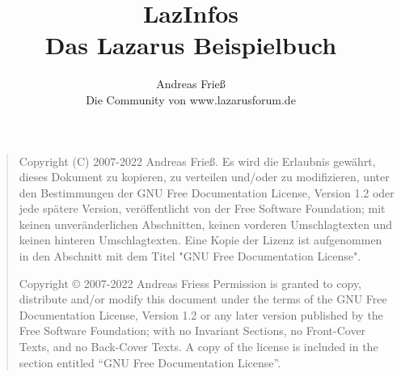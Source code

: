 \documentclass[
titlepage,						%
]
{scrreprt}
\begin{document}
\setcounter{tocdepth}{3} %

\pagestyle{empty} %
\title{LazInfos\\Das Lazarus Beispielbuch}
\author{Andreas Frieß\\Die Community von www.lazarusforum.de}

\maketitle 						%


\pagestyle{headings} %


\begin{quote}
    Copyright (C) 2007-2022 Andreas Frieß.
    Es wird die Erlaubnis gewährt, dieses Dokument zu kopieren, zu
    verteilen und/oder zu modifizieren, unter den Bestimmungen der
    GNU Free Documentation License, Version 1.2 oder jede spätere
    Version, veröffentlicht von der Free Software Foundation; mit
    keinen unveränderlichen Abschnitten, keinen vorderen
    Umschlagtexten und keinen hinteren Umschlagtexten. Eine Kopie der
    Lizenz ist aufgenommen in den Abschnitt mit dem Titel "GNU Free
    Documentation License".

    Copyright \copyright{}  2007-2022 Andreas Friess
    Permission is granted to copy, distribute and/or modify this document
    under the terms of the GNU Free Documentation License, Version 1.2
    or any later version published by the Free Software Foundation;
    with no Invariant Sections, no Front-Cover Texts, and no Back-Cover Texts.
    A copy of the license is included in the section entitled ``GNU
    Free Documentation License''.
\end{quote}
\end{document}
